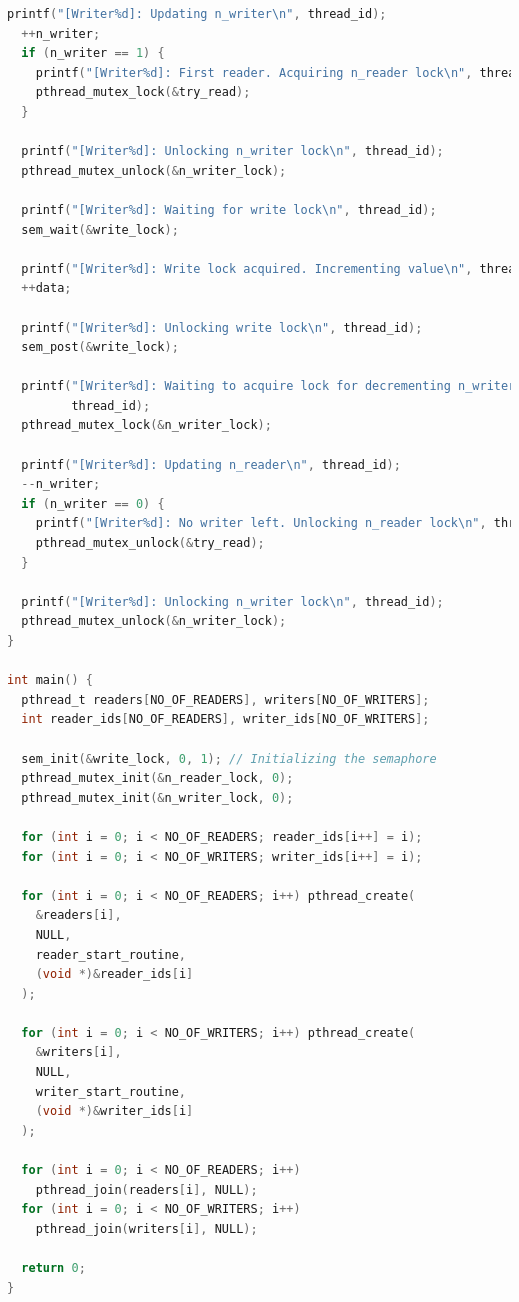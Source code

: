 \begin{lstlisting}[language=C]
  printf("[Writer%d]: Updating n_writer\n", thread_id);
  ++n_writer;
  if (n_writer == 1) {
    printf("[Writer%d]: First reader. Acquiring n_reader lock\n", thread_id);
    pthread_mutex_lock(&try_read);
  }

  printf("[Writer%d]: Unlocking n_writer lock\n", thread_id);
  pthread_mutex_unlock(&n_writer_lock);

  printf("[Writer%d]: Waiting for write lock\n", thread_id);
  sem_wait(&write_lock);

  printf("[Writer%d]: Write lock acquired. Incrementing value\n", thread_id);
  ++data;

  printf("[Writer%d]: Unlocking write lock\n", thread_id);
  sem_post(&write_lock);

  printf("[Writer%d]: Waiting to acquire lock for decrementing n_writer\n",
         thread_id);
  pthread_mutex_lock(&n_writer_lock);

  printf("[Writer%d]: Updating n_reader\n", thread_id);
  --n_writer;
  if (n_writer == 0) {
    printf("[Writer%d]: No writer left. Unlocking n_reader lock\n", thread_id);
    pthread_mutex_unlock(&try_read);
  }

  printf("[Writer%d]: Unlocking n_writer lock\n", thread_id);
  pthread_mutex_unlock(&n_writer_lock);
}

int main() {
  pthread_t readers[NO_OF_READERS], writers[NO_OF_WRITERS];
  int reader_ids[NO_OF_READERS], writer_ids[NO_OF_WRITERS];

  sem_init(&write_lock, 0, 1); // Initializing the semaphore
  pthread_mutex_init(&n_reader_lock, 0);
  pthread_mutex_init(&n_writer_lock, 0);

  for (int i = 0; i < NO_OF_READERS; reader_ids[i++] = i);
  for (int i = 0; i < NO_OF_WRITERS; writer_ids[i++] = i);

  for (int i = 0; i < NO_OF_READERS; i++) pthread_create(
    &readers[i], 
    NULL, 
    reader_start_routine,
    (void *)&reader_ids[i]
  );

  for (int i = 0; i < NO_OF_WRITERS; i++) pthread_create(
    &writers[i], 
    NULL, 
    writer_start_routine,
    (void *)&writer_ids[i]
  );

  for (int i = 0; i < NO_OF_READERS; i++)
    pthread_join(readers[i], NULL);
  for (int i = 0; i < NO_OF_WRITERS; i++)
    pthread_join(writers[i], NULL);

  return 0;
}
\end{lstlisting}

